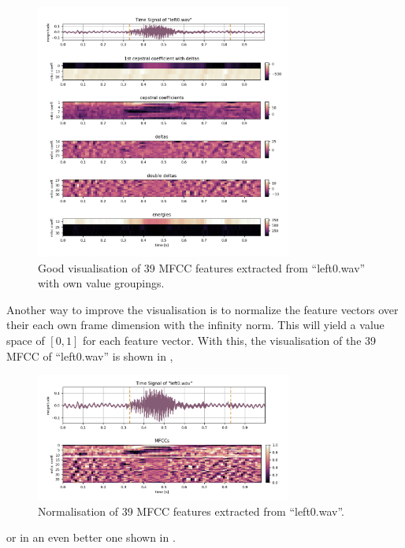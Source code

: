 \begin{figure}[!ht]
  \centering
    \includegraphics[width=0.75\textwidth]{./3_theory/figs/a3_mfcc/left0_norm0.png}
  \caption{Good visualisation of 39 MFCC features extracted from \enquote{left0.wav} with own value groupings.}
  \label{fig:left0_order}
\end{figure}
\FloatBarrier
\noindent
Another way to improve the visualisation is to normalize the feature vectors over their each own frame dimension with the infinity norm. This will yield a value space of $[0, 1]$ for each feature vector. With this, the visualisation of the 39 MFCC of \enquote{left0.wav} is shown in ,

\begin{figure}[!ht]
  \centering
    \includegraphics[width=0.75\textwidth]{./3_theory/figs/a3_mfcc/left0_no_order_norm1.png}
  \caption{Normalisation of 39 MFCC features extracted from \enquote{left0.wav}.}
  \label{fig:left0_no_order_norm1}
\end{figure}
\FloatBarrier
\noindent
or in an even better one shown in .

